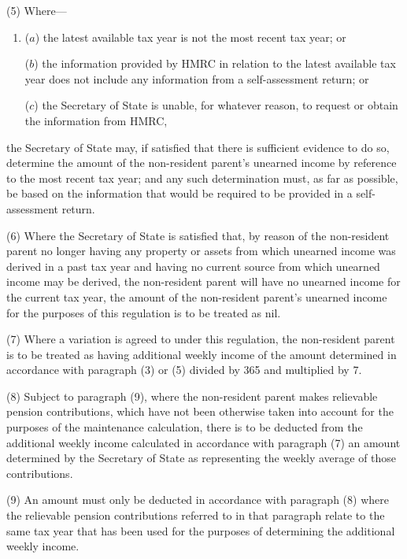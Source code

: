 \documentclass[12pt,a4paper]{article}
\begin{document}
(5) Where—
\begin{enumerate}\item[]
($a$) the latest available tax year is not the most recent tax year; or

($b$) the information provided by HMRC in relation to the latest available tax year does not include any information from a self-assessment return;
%
or

($c$) the Secretary of State is unable, for whatever reason, to request or obtain the information from HMRC,
\end{enumerate}
the Secretary of State may, if satisfied that there is sufficient evidence to do so, determine the amount of the non-resident parent’s unearned income by reference to the most recent tax year; and any such determination must, as far as possible, be based on the information that would be required to be provided in a self-assessment return.

(6) Where the Secretary of State is satisfied that, by reason of the non-resident parent no longer having any property or assets from which unearned income was derived in a past tax year and having no current source from which unearned income may be derived, the non-resident parent will have no unearned income for the current tax year, the amount of the non-resident parent’s unearned income for the purposes of this regulation is to be treated as nil.

(7) Where a variation is agreed to under this regulation, the non-resident parent is to be treated as having additional weekly income of the amount determined in accordance with paragraph (3) or (5) divided by 365 and multiplied by 7.

(8) Subject to paragraph (9), where the non-resident parent makes relievable pension contributions, which have not been otherwise taken into account for the purposes of the maintenance calculation, there is to be deducted from the additional weekly income calculated in accordance with paragraph (7) an amount determined by the Secretary of State as representing the weekly average of those contributions.

(9) An amount must only be deducted in accordance with paragraph (8) where the relievable pension contributions referred to in that paragraph relate to the same tax year that has been used for the purposes of determining the additional weekly income.
\end{document}
